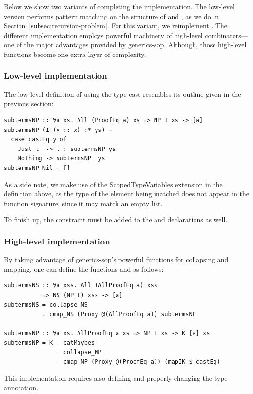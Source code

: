 \documentclass[sigplan,screen,review,anonymous]{acmart}
\begin{document}
Below we show two variants of completing the  implementation. The low-level version performs pattern matching on the structure of  and , as we do in Section~\ref{subsec:recursion-problem}. For this variant, we reimplement . The different implementation employs powerful machinery of high-level combinators---one of the major advantages provided by \textsf{generics-sop}. Although, those high-level functions become one extra layer of complexity.

\subsubsection{Low-level implementation}

The low-level definition of  using the type cast resembles its outline given in the previous section:
\begin{lstlisting}[style=fancy]
subtermsNP :: ∀a xs. All (ProofEq a) xs => NP I xs -> [a]
subtermsNP (I (y :: x) :* ys) =
  case castEq y of
    Just t  -> t : subtermsNP ys
    Nothing -> subtermsNP  ys
subtermsNP Nil = []
\end{lstlisting}

As a side note, we make use of the \textsf{ScopedTypeVariables} extension in the definition above, as the type of the element being matched does not appear in the function signature, since it may match an empty list. 

To finish up, the  constraint must be added to the  and  declarations as well.

\subsubsection{High-level implementation}

By taking advantage of \textsf{generics-sop}'s powerful functions for collapsing and mapping, one can define the functions  and  as follows:
\begin{lstlisting}[style=fancy]
subtermsNS :: ∀a xss. All (AllProofEq a) xss
           => NS (NP I) xss -> [a]
subtermsNS = collapse_NS
           . cmap_NS (Proxy @(AllProofEq a)) subtermsNP

subtermsNP :: ∀a xs. AllProofEq a xs => NP I xs -> K [a] xs
subtermsNP = K . catMaybes
               . collapse_NP
               . cmap_NP (Proxy @(ProofEq a)) (mapIK $ castEq)
\end{lstlisting}
This implementation requires also defining  and properly changing the  type annotation.
\end{document}
